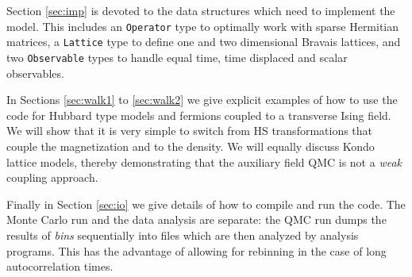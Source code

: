 	   Section \ref{sec:imp} is devoted to the data structures which  need to implement the model.  This includes  an \texttt{Operator} type to  optimally work with sparse Hermitian matrices, a \texttt{Lattice} type  to define one and two dimensional Bravais lattices, and   two   \texttt{Observable} types to handle equal time, time displaced and scalar observables. 
	   
	   In Sections \ref{sec:walk1}  to \ref{sec:walk2}  we give explicit examples of how to use the code for  Hubbard type models and fermions coupled to a transverse Ising field. We will show that it is very simple  to switch from HS transformations that couple the magnetization and to the density.  We will equally discuss Kondo lattice models,  thereby demonstrating that the auxiliary field QMC is  not a {\it weak } coupling approach. 
	   
	   Finally in Section \ref{sec:io} we give details of how to compile and  run the code.   The Monte Carlo run and the  data analysis  are separate: the QMC run  dumps the results of {\it bins}  sequentially into files  which are then analyzed by  analysis programs. This has the advantage of allowing   for rebinning  in the case of long autocorrelation times. 

		
				


